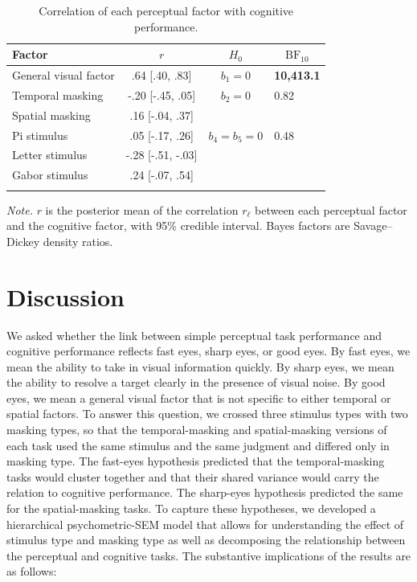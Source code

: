 \documentclass[
  ,man]{apa6}
\begin{document}
\begin{table}[tbp]

\begin{center}
\begin{threeparttable}

\caption{\label{tab:tab-cor}Correlation of each perceptual factor with cognitive performance.}

\begin{tabular}{lccl}
\toprule
Factor & \multicolumn{1}{c}{$r$} & \multicolumn{1}{c}{$H_0$} & \multicolumn{1}{c}{$\text{BF}_{10}$}\\
\midrule
General visual factor & .64 [.40, .83] & $b_1 = 0$ & \textbf{10,413.1}\\
Temporal masking & -.20 [-.45, .05] & $b_2 = 0$ & 0.82\\
Spatial masking & .16 [-.04, .37] &  & \\
Pi stimulus & .05 [-.17, .26] & $b_4 = b_5 = 0$ & 0.48\\
Letter stimulus & -.28 [-.51, -.03] &  & \\
Gabor stimulus & .24 [-.07, .54] &  & \\
\bottomrule
\addlinespace
\end{tabular}

\begin{tablenotes}[para]
\normalsize{\textit{Note.} $r$ is the posterior mean of the correlation $r_\ell$ between each perceptual factor and the cognitive factor, with 95\% credible interval. Bayes factors are Savage--Dickey density ratios.}
\end{tablenotes}

\end{threeparttable}
\end{center}

\end{table}

\section{Discussion}\label{discussion}

We asked whether the link between simple perceptual task performance and cognitive performance reflects fast eyes, sharp eyes, or good eyes. By fast eyes, we mean the ability to take in visual information quickly. By sharp eyes, we mean the ability to resolve a target clearly in the presence of visual noise. By good eyes, we mean a general visual factor that is not specific to either temporal or spatial factors. To answer this question, we crossed three stimulus types with two masking types, so that the temporal-masking and spatial-masking versions of each task used the same stimulus and the same judgment and differed only in masking type. The fast-eyes hypothesis predicted that the temporal-masking tasks would cluster together and that their shared variance would carry the relation to cognitive performance. The sharp-eyes hypothesis predicted the same for the spatial-masking tasks. To capture these hypotheses, we developed a hierarchical psychometric-SEM model that allows for understanding the effect of stimulus type and masking type as well as decomposing the relationship between the perceptual and cognitive tasks. The substantive implications of the results are as follows:
\end{document}

